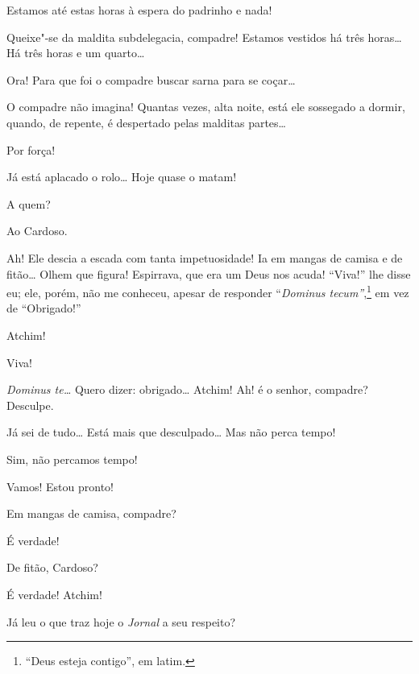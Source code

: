  Estamos até estas horas à espera do padrinho e nada!

 Queixe"-se da maldita subdelegacia, compadre! Estamos vestidos
há três horas\ldots{}  Há três horas e um quarto\ldots{}

 Ora! Para que foi o compadre buscar sarna para se coçar\ldots{}

 O compadre não imagina! Quantas vezes, alta noite, está ele
sossegado a dormir, quando, de
repente, é despertado pelas malditas partes\ldots{}

 Por força!

  Já está aplacado o rolo\ldots{}
 Hoje quase o matam!

  A quem?

 Ao Cardoso.

 Ah! Ele descia a escada com tanta impetuosidade! Ia em mangas
de camisa e de fitão\ldots{} Olhem que
figura! Espirrava, que era um Deus nos acuda! “Viva!” lhe disse eu; ele,
porém, não me conheceu, apesar de
responder ``\textit{Dominus tecum”},\footnote{ “Deus esteja contigo”, em latim.}
em vez de ``Obrigado!”



  Atchim!

 Viva!

 \textit{Dominus te\ldots{}} Quero dizer: obrigado\ldots{} Atchim! Ah! é o
senhor, compadre? Desculpe.

 Já sei de tudo\ldots{} Está mais que desculpado\ldots{} Mas não perca
tempo!

 Sim, não percamos tempo!

 Vamos!  Estou pronto!

 Em mangas de camisa, compadre?

 É verdade! 

 De fitão, Cardoso?

 É verdade!  Atchim!

 Já leu o que traz hoje o \textit{Jornal} a seu respeito?

